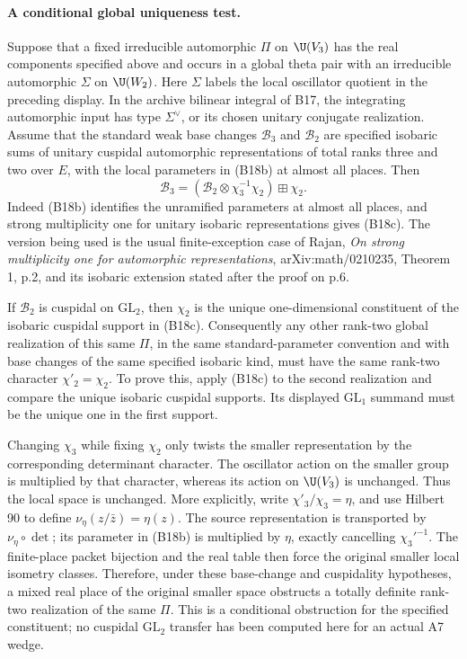 \documentclass[11pt]{article}
\theoremstyle{definition}\newtheorem{definition}[theorem]{Definition}\newtheorem{remark}[theorem]{Remark}
\begin{document}
\paragraph{A conditional global uniqueness test.}
Suppose that a fixed irreducible automorphic $\Pi$ on $\U(V_3)$
has the real components specified above and occurs in a global
theta pair with an irreducible automorphic $\Sigma$ on $\U(W_2)$.
Here $\Sigma$ labels the local oscillator quotient in the
preceding display. In the archive bilinear integral of B17, the
integrating automorphic input has type $\Sigma^\vee$, or its
chosen unitary conjugate realization. Assume that the standard
weak base changes $\mathcal B_3$ and $\mathcal B_2$ are specified isobaric
sums of unitary cuspidal automorphic representations of total
ranks three and two over $E$, with the local parameters in (B18b)
at almost all places. Then
\[
 \mathcal B_3=
   (\mathcal B_2\otimes\chi_3^{-1}\chi_2)\boxplus\chi_2.
 \tag{B18c}
\]
Indeed (B18b) identifies the unramified parameters at almost all
places, and strong multiplicity one for unitary isobaric
representations gives (B18c). The version being used is the
usual finite-exception case of Rajan, \emph{On strong
multiplicity one for automorphic representations},
arXiv:math/0210235, Theorem 1, p.2, and its isobaric extension
stated after the proof on p.6.

If $\mathcal B_2$ is cuspidal on $\mathrm{GL}_2$, then
$\chi_2$ is the unique one-dimensional constituent of the
isobaric cuspidal support in (B18c). Consequently any other
rank-two global realization of this same $\Pi$, in the same
standard-parameter convention and with base changes of the
same specified isobaric kind, must have the same rank-two character
$\chi'_2=\chi_2$. To prove this, apply (B18c) to the second
realization and compare the unique isobaric cuspidal supports.
Its displayed $\mathrm{GL}_1$ summand must be the unique one
in the first support.

Changing $\chi_3$ while fixing $\chi_2$ only twists the smaller
representation by the corresponding determinant character.
The oscillator action on the smaller group is multiplied by
that character, whereas its action on $\U(V_3)$ is unchanged.
Thus the local space is unchanged. More explicitly, write
$\chi'_3/\chi_3=\eta$, and use Hilbert 90 to define
$\nu_\eta(z/\bar z)=\eta(z)$. The source representation is
transported by $\nu_\eta\circ\det$; its parameter in (B18b)
is multiplied by $\eta$, exactly cancelling $\chi_3'^{-1}$.
The finite-place packet bijection and the real table then
force the original smaller local isometry classes.
Therefore, under these base-change and cuspidality hypotheses,
a mixed real place of the original smaller space obstructs a
totally definite rank-two realization of the same $\Pi$.
This is a conditional obstruction for the specified constituent;
no cuspidal $\mathrm{GL}_2$ transfer has been computed here for
an actual A7 wedge.
\end{document}

